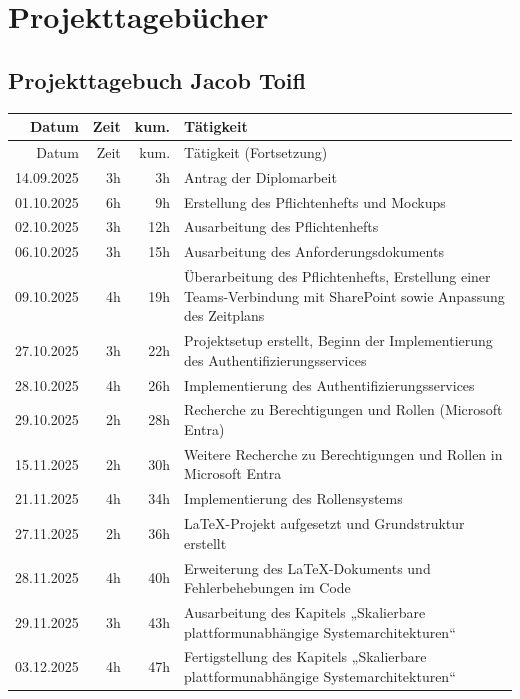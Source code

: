 \section{Projekttagebücher}
\subsection{Projekttagebuch Jacob Toifl}

\begin{longtable}{r | r | r | p{}}
    Datum & Zeit & kum. & Tätigkeit \\ \hline
    \endfirsthead
    
    Datum & Zeit & kum. & Tätigkeit (Fortsetzung) \\ \hline
    \endhead

    14.09.2025 & 3h & 3h & Antrag der Diplomarbeit \\
    01.10.2025 & 6h & 9h & Erstellung des Pflichtenhefts und Mockups \\
    02.10.2025 & 3h & 12h & Ausarbeitung des Pflichtenhefts \\
    06.10.2025 & 3h & 15h & Ausarbeitung des Anforderungsdokuments \\
    09.10.2025 & 4h & 19h & Überarbeitung des Pflichtenhefts, Erstellung einer Teams-Verbindung mit SharePoint sowie Anpassung des Zeitplans \\
    27.10.2025 & 3h & 22h & Projektsetup erstellt, Beginn der Implementierung des Authentifizierungsservices \\
    28.10.2025 & 4h & 26h & Implementierung des Authentifizierungsservices \\
    29.10.2025 & 2h & 28h & Recherche zu Berechtigungen und Rollen (Microsoft Entra) \\
    15.11.2025 & 2h & 30h & Weitere Recherche zu Berechtigungen und Rollen in Microsoft Entra \\
    21.11.2025 & 4h & 34h & Implementierung des Rollensystems \\
    27.11.2025 & 2h & 36h & LaTeX-Projekt aufgesetzt und Grundstruktur erstellt \\
    28.11.2025 & 4h & 40h & Erweiterung des LaTeX-Dokuments und Fehlerbehebungen im Code \\
    29.11.2025 & 3h & 43h & Ausarbeitung des Kapitels „Skalierbare plattformunabhängige Systemarchitekturen“ \\
    03.12.2025 & 4h & 47h & Fertigstellung des Kapitels „Skalierbare plattformunabhängige Systemarchitekturen“ \\

\end{longtable}
